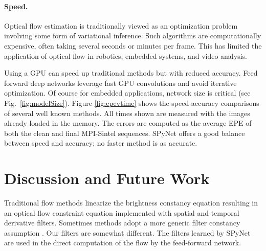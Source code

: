 \documentclass[10pt,twocolumn,letterpaper]{article}
\begin{document}
\paragraph{Speed.}
 Optical flow estimation is traditionally viewed as an optimization problem involving some form of variational inference.
Such algorithms are  computationally expensive, often taking several seconds or minutes per frame.
This has limited the application of optical flow in robotics, embedded systems, and video analysis.

Using a GPU can speed up traditional methods \cite{sundaram2010dense,Werlberger2009:GPUflow} but with reduced accuracy.
Feed forward deep networks \cite{dosovitskiy2015flownet} leverage fast
GPU convolutions and avoid iterative optimization.
Of course for embedded applications, network size is critical (see Fig.~\ref{fig:modelSize}).
Figure \ref{fig:epevtime} shows the speed-accuracy comparisons of several well known methods.
All times shown are measured with the images already loaded in the memory. 
The errors are computed as the average EPE of both the clean and final MPI-Sintel sequences. 
SPyNet offers a good balance between speed and accuracy; no
faster method  is as accurate.

\section{Discussion and Future Work}
Traditional flow methods linearize the brightness constancy equation resulting in an optical flow constraint equation
implemented with spatial and temporal derivative filters.
Sometimes methods adopt a more generic filter constancy assumption \cite{adelson1984pyramid,brox2004high}.
Our filters are somewhat different.  
The filters learned by SPyNet are used in the direct computation of the flow by the feed-forward network.  
\end{document}
